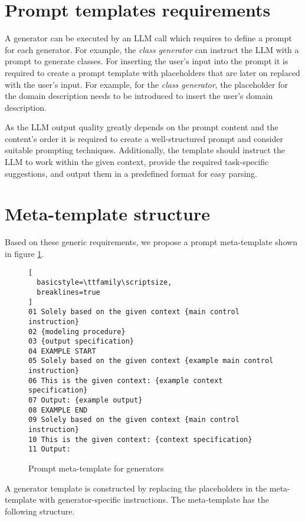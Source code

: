 \section{Prompt templates requirements}

A generator can be executed by an LLM call which requires to define a prompt for each generator. For example, the \emph{class generator} can instruct the LLM with a prompt to generate classes. For inserting the user's input into the prompt it is required to create a prompt template with placeholders that are later on replaced with the user's input. For example, for the \emph{class generator}, the placeholder for the domain description needs to be introduced to insert the user's domain description.

As the LLM output quality greatly depends on the prompt content and the content's order it is required to create a well-structured prompt and consider suitable prompting techniques. Additionally, the template should instruct the LLM to work within the given context, provide the required task-specific suggestions, and output them in a predefined format for easy parsing.


\section{Meta-template structure}

Based on these generic requirements, we propose a prompt meta-template shown in figure \ref{fig:meta-templates}.

\begin{figure}[!h]
    \centering
\begin{lstlisting}[
  basicstyle=\ttfamily\scriptsize,
  breaklines=true
]
01 Solely based on the given context {main control instruction}
02 {modeling procedure}
03 {output specification}
04 EXAMPLE START
05 Solely based on the given context {example main control instruction}
06 This is the given context: {example context specification}
07 Output: {example output}
08 EXAMPLE END
09 Solely based on the given context {main control instruction}
10 This is the given context: {context specification}
11 Output:
\end{lstlisting}
    \caption{\centering Prompt meta-template for generators}
    \label{fig:meta-templates}
\end{figure}


A generator template is constructed by replacing the placeholders in the meta-template with generator-specific instructions. The meta-template has the following structure.

